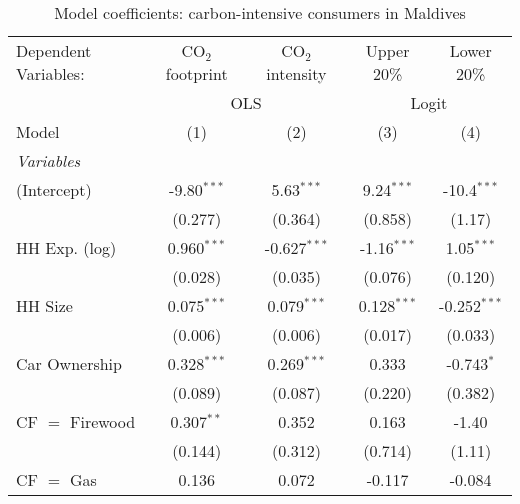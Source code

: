 
\begin{table}[htbp!]
   \centering
   \small
   \begin{adjustbox}{width = 1\textwidth, max height = 0.95\textheight, center}
      \begin{threeparttable}[b]
         \caption{\label{tab:Logit_1_MDV} Model coefficients: carbon-intensive consumers in Maldives}
         \begin{tabular}{lcccc}
            \tabularnewline \midrule \midrule
            Dependent Variables: & CO$_{2}$ footprint & CO$_{2}$ intensity & Upper 20\%     & Lower 20\%\\   
             & \multicolumn{2}{c}{OLS} & \multicolumn{2}{c}{Logit} \\ 
            Model                & (1)                & (2)                & (3)            & (4)\\  
            \midrule
            \emph{Variables}\\
            (Intercept)          & -9.80$^{***}$      & 5.63$^{***}$       & 9.24$^{***}$   & -10.4$^{***}$\\   
                                 & (0.277)            & (0.364)            & (0.858)        & (1.17)\\   
            HH Exp. (log)        & 0.960$^{***}$      & -0.627$^{***}$     & -1.16$^{***}$  & 1.05$^{***}$\\   
                                 & (0.028)            & (0.035)            & (0.076)        & (0.120)\\   
            HH Size              & 0.075$^{***}$      & 0.079$^{***}$      & 0.128$^{***}$  & -0.252$^{***}$\\   
                                 & (0.006)            & (0.006)            & (0.017)        & (0.033)\\   
            Car Ownership        & 0.328$^{***}$      & 0.269$^{***}$      & 0.333          & -0.743$^{*}$\\   
                                 & (0.089)            & (0.087)            & (0.220)        & (0.382)\\   
            CF $=$ Firewood      & 0.307$^{**}$       & 0.352              & 0.163          & -1.40\\   
                                 & (0.144)            & (0.312)            & (0.714)        & (1.11)\\   
            CF $=$ Gas           & 0.136              & 0.072              & -0.117         & -0.084\\   

\end{tabular}
\end{threeparttable}
\end{adjustbox}
\end{table}
